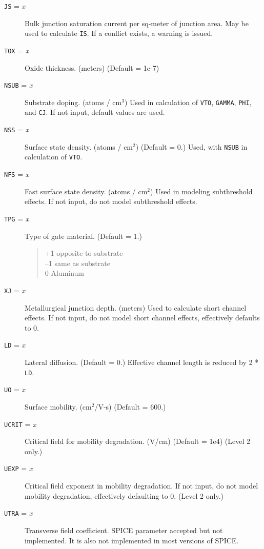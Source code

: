 \begin{description}
\item[{\tt JS} = {\it x}] Bulk junction saturation current per sq-meter of
junction area.  May be used to calculate {\tt IS}.  If a conflict exists, a
warning is issued.

\item[{\tt TOX} = {\it x}] Oxide thickness. (meters) (Default = 1e-7)

\item[{\tt NSUB} = {\it x}] Substrate doping.  (atoms / cm$^3$) Used in
calculation of {\tt VTO}, {\tt GAMMA}, {\tt PHI}, and {\tt CJ}.  If not
input, default values are used.

\item[{\tt NSS} = {\it x}] Surface state density.  (atoms / cm$^2$) (Default
= 0.) Used, with {\tt NSUB} in calculation of {\tt VTO}.

\item[{\tt NFS} = {\it x}] Fast surface state density.  (atoms / cm$^2$) Used
in modeling subthreshold effects.  If not input, do not model subthreshold
effects.

\item[{\tt TPG} = {\it x}] Type of gate material. (Default = 1.)
\begin{verse}
+1 opposite to substrate\\
--1 same as substrate\\
0 Aluminum
\end{verse}

\item[{\tt XJ} = {\it x}] Metallurgical junction depth. (meters) Used to
calculate short channel effects.  If not input, do not model short channel
effects, effectively defaults to 0.

\item[{\tt LD} = {\it x}] Lateral diffusion. (Default = 0.)  Effective
channel length is reduced by 2 * {\tt LD}.

\item[{\tt UO} = {\it x}] Surface mobility. (cm$^2$/V-s) (Default = 600.)

\item[{\tt UCRIT} = {\it x}] Critical field for mobility degradation.
(V/cm) (Default = 1e4)  (Level 2 only.)

\item[{\tt UEXP} = {\it x}] Critical field exponent in mobility
degradation.  If not input, do not model mobility degradation,
effectively defaulting to 0.  (Level 2 only.)

\item[{\tt UTRA} = {\it x}] Transverse field coefficient.  SPICE parameter
accepted but not implemented.  It is also not implemented in most versions
of SPICE.


\end{description}
